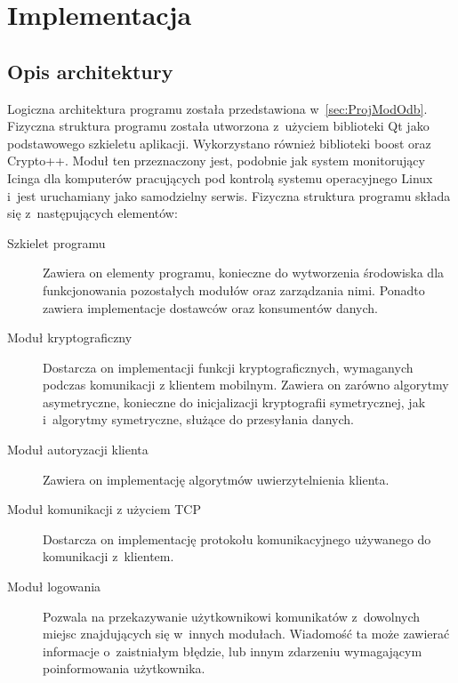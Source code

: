 \chapter{Implementacja}
\label{chap:Implementacja}

\section[Opis architektury][Opis architektury]{Opis architektury}

Logiczna architektura programu została przedstawiona
w~\ref{sec:ProjModOdb}. Fizyczna struktura programu została utworzona
z~użyciem biblioteki Qt jako podstawowego szkieletu
aplikacji. Wykorzystano również biblioteki boost oraz Crypto++. Moduł
ten przeznaczony jest, podobnie jak system monitorujący Icinga dla
komputerów pracujących pod kontrolą systemu operacyjnego Linux i~jest
uruchamiany jako samodzielny serwis. Fizyczna struktura programu
składa się z~następujących elementów:

\begin{description}
\item[Szkielet programu] Zawiera on elementy programu, konieczne do
  wytworzenia środowiska dla funkcjonowania pozostałych modułów oraz
  zarządzania nimi. Ponadto zawiera implementacje dostawców oraz
  konsumentów danych.
\item[Moduł kryptograficzny] Dostarcza on implementacji funkcji
  kryptograficznych, wymaganych podczas komunikacji z klientem
  mobilnym. Zawiera on zarówno algorytmy asymetryczne, konieczne do
  inicjalizacji kryptografii symetrycznej, jak i~algorytmy symetryczne,
  służące do przesyłania danych.
\item[Moduł autoryzacji klienta] Zawiera on implementację algorytmów
  uwierzytelnienia klienta.
\item[Moduł komunikacji z użyciem TCP] Dostarcza on implementację
  protokołu komunikacyjnego używanego do komunikacji z~klientem.
\item[Moduł logowania] Pozwala na przekazywanie użytkownikowi
  komunikatów z~dowolnych miejsc znajdujących się w~innych
  modułach. Wiadomość ta może zawierać informacje o~zaistniałym
  błędzie, lub innym zdarzeniu wymagającym poinformowania użytkownika.
\end{description}


